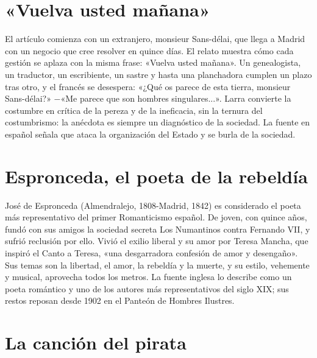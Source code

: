 \documentclass{book}
\begin{document}

\section{«Vuelva usted mañana»}

El artículo comienza con un extranjero, monsieur Sans-délai, que llega a Madrid con un negocio que cree resolver en quince días. El relato muestra cómo cada gestión se aplaza con la misma frase: «Vuelva usted mañana». Un genealogista, un traductor, un escribiente, un sastre y hasta una planchadora cumplen un plazo tras otro, y el francés se desespera: «¿Qué os parece de esta tierra, monsieur Sans-délai?» \(-\)«Me parece que son hombres singulares...». Larra convierte la costumbre en crítica de la pereza y de la ineficacia, sin la ternura del costumbrismo: la anécdota es siempre un diagnóstico de la sociedad. La fuente en español señala que ataca la organización del Estado y se burla de la sociedad.


\section{Espronceda, el poeta de la rebeldía}

José de Espronceda (Almendralejo, 1808-Madrid, 1842) es considerado el poeta más representativo del primer Romanticismo español. De joven, con quince años, fundó con sus amigos la sociedad secreta Los Numantinos contra Fernando VII, y sufrió reclusión por ello. Vivió el exilio liberal y su amor por Teresa Mancha, que inspiró el Canto a Teresa, «una desgarradora confesión de amor y desengaño». Sus temas son la libertad, el amor, la rebeldía y la muerte, y su estilo, vehemente y musical, aprovecha todos los metros. La fuente inglesa lo describe como un poeta romántico y uno de los autores más representativos del siglo XIX; sus restos reposan desde 1902 en el Panteón de Hombres Ilustres.


\section{La canción del pirata}
\end{document}

